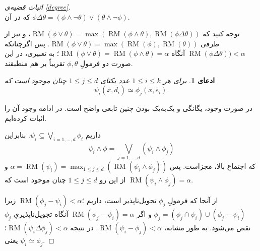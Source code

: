 \documentclass[12pt,a4paper]{report}
\theoremstyle{colorhead}
\newtheorem{claim}[thm]{ادعای}
\DeclareMathOperator{\RM}{RM}
\begin{document}
\begin{proof}[اثبات قضیه‌ی 
\ref{degree}]
\[\]
که در آن 
$\phi\Delta \theta =(\phi\wedge \neg \theta)\vee (\theta\wedge\neg \phi)$.
\par 
توجه کنید که 
$\RM(\phi\vee \theta)=\max(\RM(\phi\wedge\theta), \RM (\phi\Delta\theta))$،
و نیز از طرفی
\mbox{$\RM(\phi\vee \theta)=\max(\RM(\phi),\RM(\theta))$}.
پس اگرچنانکه 
$\RM (\phi\Delta\theta))<\alpha$
آنگاه 
\mbox{$\RM(\phi\vee \theta)=\RM(\phi\wedge\theta)=\alpha$؛}
به تعبیری، در این صورت دو فرمولِ
$\phi,\theta$
تقریباً بر هم منطبقند. 
\begin{claim}
	برای هر
	$1\leq i\leq k$
	عدد یکتای
	$1\leq j\leq d$
	چنان موجود است که
	\[
	\psi_i(\bar{x},\bar{d}_i)\simeq \phi_j(\bar{x},\bar{e}_i).
	\]
	\end{claim}
در صورت وجود، یگانگی و یک‌به‌یک بودن چنین تابعی واضح است. در ادامه وجود آن را اثبات کرده‌ایم.
\par 
داریم
$\psi_i\subseteq \bigvee_{i=1,\ldots,d}\phi_i$.
بنابراین
\[
\psi_i\wedge\phi=\bigvee_{j=1,\ldots,d}(\psi_i\wedge\phi_j)
\]
که اجتماع بالا، مجزاست. پس 
$\alpha=\RM(\psi_i)=\max_{1\leq j\leq d} (\RM(\psi_i\wedge\phi_j))$
و از این رو
$1\leq j\leq d$
چنان موجود است که
$\RM(\psi_i\wedge\phi_j)=\alpha$.
\par 
از آنجا که فرمولِ
$\phi_j$
تحویل‌ناپذیر است، داریم
؛$\RM(\phi_j-\psi_i)<\alpha$
زیرا 
\mbox{$\phi_j=(\phi_j\cap \psi_i)\cup (\phi_j-\psi_i)$}
و اگر
$\RM(\phi_j-\psi_i)=\alpha$
آنگاه تجویل‌ناپذیریِ
$\phi_j$
نقض می‌شود.  به طور مشابه،
$\RM(\psi_i-\phi_j)<\alpha$.
در نتیجه
$\RM(\psi_i\Delta\phi_j)<\alpha$؛
یعنی
$\psi_i\simeq \phi_j$.
	\end{proof}
\pagebreak
\end{document}
